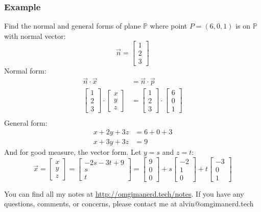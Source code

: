\documentclass{math}
\begin{document}
\subsubsection*{Example}
Find the normal and general forms of plane \( \mathbb{P} \) where point
\( P = (6,0,1) \) is on \( \mathbb{P} \) with normal vector:
\[ \vec{n} = \begin{bmatrix}1 \\ 2 \\ 3\end{bmatrix} \]
Normal form:
\begin{align*}
  \vec{n}\cdot\vec{x} &= \vec{n}\cdot\vec{p} \\
  \begin{bmatrix}1 \\ 2 \\ 3\end{bmatrix}\cdot
    \begin{bmatrix}x \\ y \\ z\end{bmatrix} &=
    \begin{bmatrix}1 \\ 2 \\ 3\end{bmatrix}\cdot
    \begin{bmatrix}6 \\ 0 \\ 1\end{bmatrix} \\
\end{align*}
General form:
\begin{align*}
  x+2y+3z &= 6+0+3 \\
  x+3y+3z &= 9
\end{align*}
And for good measure, the vector form. Let \( y = s \) and \( z = t \):
\[ \vec{x} = \begin{bmatrix}x \\ y \\ z\end{bmatrix} =
  \begin{bmatrix}-2s-3t+9 \\ s \\ t\end{bmatrix} =
  \begin{bmatrix}9 \\ 0 \\ 0\end{bmatrix}+
  s\begin{bmatrix}-2 \\ 1 \\ 0\end{bmatrix}+
  t\begin{bmatrix}-3 \\ 0 \\ 1\end{bmatrix} \]

\begin{center}
  You can find all my notes at \url{http://omgimanerd.tech/notes}. If you have
  any questions, comments, or concerns, please contact me at
  alvin@omgimanerd.tech
\end{center}
\end{document}
